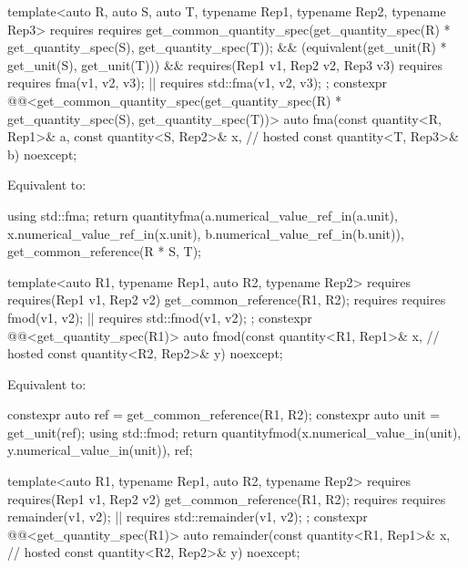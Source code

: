 \begin{itemdecl}
template<auto R, auto S, auto T, typename Rep1, typename Rep2, typename Rep3>
  requires
    requires {
      get_common_quantity_spec(get_quantity_spec(R) * get_quantity_spec(S),
                               get_quantity_spec(T));
    } && (equivalent(get_unit(R) * get_unit(S), get_unit(T))) &&
    requires(Rep1 v1, Rep2 v2, Rep3 v3) {
      requires requires { fma(v1, v2, v3); } || requires { std::fma(v1, v2, v3); };
    }
constexpr @@<get_common_quantity_spec(get_quantity_spec(R) * get_quantity_spec(S),
                                              get_quantity_spec(T))> auto
fma(const quantity<R, Rep1>& a, const quantity<S, Rep2>& x,                             // hosted
    const quantity<T, Rep3>& b) noexcept;
\end{itemdecl}

\begin{itemdescr}
\pnum
\effects
Equivalent to:
\begin{codeblock}
using std::fma;
return quantity{fma(a.numerical_value_ref_in(a.unit), x.numerical_value_ref_in(x.unit),
                    b.numerical_value_ref_in(b.unit)),
                get_common_reference(R * S, T)};
\end{codeblock}
\end{itemdescr}

\begin{itemdecl}
template<auto R1, typename Rep1, auto R2, typename Rep2>
  requires requires(Rep1 v1, Rep2 v2) {
    get_common_reference(R1, R2);
    requires requires { fmod(v1, v2); } || requires { std::fmod(v1, v2); };
  }
constexpr @@<get_quantity_spec(R1)> auto fmod(const quantity<R1, Rep1>& x,      // hosted
                                                      const quantity<R2, Rep2>& y) noexcept;
\end{itemdecl}

\begin{itemdescr}
\pnum
\effects
Equivalent to:
\begin{codeblock}
constexpr auto ref = get_common_reference(R1, R2);
constexpr auto unit = get_unit(ref);
using std::fmod;
return quantity{fmod(x.numerical_value_in(unit), y.numerical_value_in(unit)), ref};
\end{codeblock}
\end{itemdescr}

\begin{itemdecl}
template<auto R1, typename Rep1, auto R2, typename Rep2>
  requires requires(Rep1 v1, Rep2 v2) {
    get_common_reference(R1, R2);
    requires requires { remainder(v1, v2); } || requires { std::remainder(v1, v2); };
  }
constexpr @@<get_quantity_spec(R1)> auto remainder(const quantity<R1, Rep1>& x, // hosted
                                                           const quantity<R2, Rep2>& y) noexcept;
\end{itemdecl}

